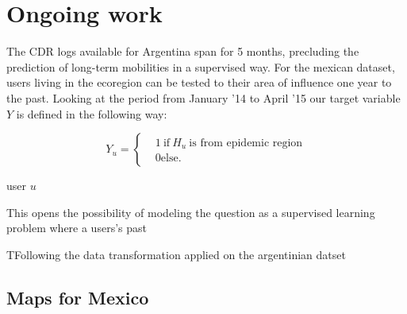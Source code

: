 \section{Ongoing work}

The CDR logs available for Argentina span for 5 months, precluding the prediction of long-term mobilities in a supervised way. For the mexican dataset, users living in the ecoregion can be tested to their area of influence one year to the past. Looking at the period from January '14 to April '15 our target variable $Y $ is defined in the following way: 

\[
    Y_u =
      \begin{cases}
        &1 \ \mbox{if} \ H_u \ \mbox{is from epidemic region}\\
        &0 \mbox{else}.
      \end{cases}
    \]

user $u$ 

This opens the possibility of modeling the question as a supervised learning problem where a users's past 

TFollowing the data transformation applied on the argentinian datset

\subsection{Maps for Mexico}
